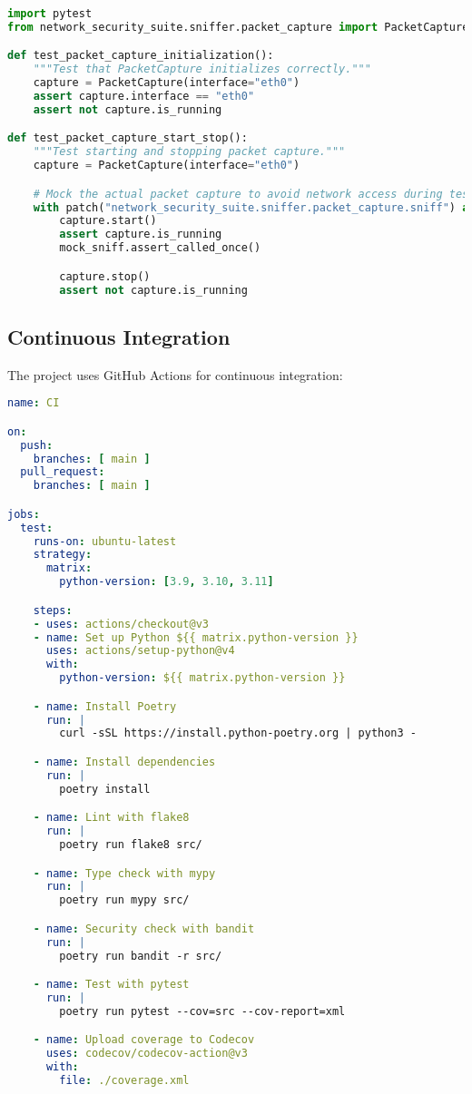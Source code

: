 \begin{lstlisting}[language=python, caption=Test Example]
import pytest
from network_security_suite.sniffer.packet_capture import PacketCapture

def test_packet_capture_initialization():
    """Test that PacketCapture initializes correctly."""
    capture = PacketCapture(interface="eth0")
    assert capture.interface == "eth0"
    assert not capture.is_running

def test_packet_capture_start_stop():
    """Test starting and stopping packet capture."""
    capture = PacketCapture(interface="eth0")

    # Mock the actual packet capture to avoid network access during tests
    with patch("network_security_suite.sniffer.packet_capture.sniff") as mock_sniff:
        capture.start()
        assert capture.is_running
        mock_sniff.assert_called_once()

        capture.stop()
        assert not capture.is_running
\end{lstlisting}

\subsection{Continuous Integration}
The project uses GitHub Actions for continuous integration:

\begin{lstlisting}[language=yaml, caption=GitHub Workflow Example]
name: CI

on:
  push:
    branches: [ main ]
  pull_request:
    branches: [ main ]

jobs:
  test:
    runs-on: ubuntu-latest
    strategy:
      matrix:
        python-version: [3.9, 3.10, 3.11]

    steps:
    - uses: actions/checkout@v3
    - name: Set up Python ${{ matrix.python-version }}
      uses: actions/setup-python@v4
      with:
        python-version: ${{ matrix.python-version }}

    - name: Install Poetry
      run: |
        curl -sSL https://install.python-poetry.org | python3 -

    - name: Install dependencies
      run: |
        poetry install

    - name: Lint with flake8
      run: |
        poetry run flake8 src/

    - name: Type check with mypy
      run: |
        poetry run mypy src/

    - name: Security check with bandit
      run: |
        poetry run bandit -r src/

    - name: Test with pytest
      run: |
        poetry run pytest --cov=src --cov-report=xml

    - name: Upload coverage to Codecov
      uses: codecov/codecov-action@v3
      with:
        file: ./coverage.xml
\end{lstlisting}

